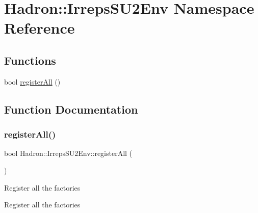 \hypertarget{namespaceHadron_1_1IrrepsSU2Env}{}\section{Hadron\+:\+:Irreps\+S\+U2\+Env Namespace Reference}
\label{namespaceHadron_1_1IrrepsSU2Env}
\subsection*{Functions}
\begin{DoxyCompactItemize}
\item 
bool \mbox{\hyperlink{namespaceHadron_1_1IrrepsSU2Env_a431c2f7d56a7ee761b4dda2bb49cfd70}{register\+All}} ()
\end{DoxyCompactItemize}


\subsection{Function Documentation}
\mbox{\label{namespaceHadron_1_1IrrepsSU2Env_a431c2f7d56a7ee761b4dda2bb49cfd70}} 
\subsubsection{\texorpdfstring{registerAll()}{registerAll()}}
{\footnotesize\ttfamily bool Hadron\+::\+Irreps\+S\+U2\+Env\+::register\+All (\begin{DoxyParamCaption}{ }\end{DoxyParamCaption})}

Register all the factories

Register all the factories


